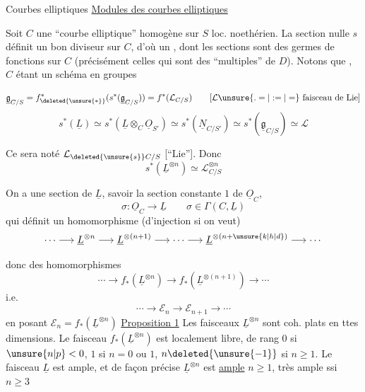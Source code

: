 Courbes elliptiques
\uline{Modules des courbes elliptiques}

Soit $C$ une ``courbe elliptique'' homogène sur $S$ loc. noethérien. La section nulle $s$ définit un bon diviseur  sur $C$, d'où un , dont les  sections sont des  germes de fonctions sur $C$ (précisément celles qui sont des ``multiples'' de $D$). Notons que , $C$ étant un schéma en groupes


\[
\underline{\mathfrak g}_{C/S}=f^{*}_{\deleted{\unsure{*}}}(s^*(\underline{\mathfrak g}_{C/S}))=f^*(\mathcal L_{C/S})\qquad [\mathcal L\unsure{.=|:=|=}\text{ faisceau de Lie}]
\]
\[
s^*(\underline L)\simeq s^*(\underline L\otimes_C\underline O_{S'})\simeq s^*(\underline N_{C/S'})\simeq s^*(\underline{\mathfrak g}_{C/S})\simeq\mathcal L
\]

Ce  sera noté $\mathcal L_{\deleted{\unsure{s}}C/S}$ [``Lie'']. Donc
\[
s^*(\underline L^{\otimes n})\simeq\mathcal L_{C/S}^{\otimes n}
\]

On a une section  de $\underline L$, savoir la section constante $1$ de $\underline O_C$,
\[
\sigma:\underline O_C\longrightarrow\underline L\qquad \sigma\in\Gamma(C,\underline L)
\]
qui définit un homomorphisme (d'injection si on veut)
\[
\cdots\longrightarrow\underline L^{\otimes n}\longrightarrow\underline L^{\otimes(n+1)}
\longrightarrow\cdots\longrightarrow\underline L^{\otimes(n+\unsure{k|h|d})}\longrightarrow\cdots
\]

donc  des homomorphismes
\[
\cdots\longrightarrow f_*(\underline L^{\otimes n})\longrightarrow f_*(\underline L^{\otimes(n+1)})\longrightarrow\cdots
\]
i.e.
\[
\cdots\longrightarrow\mathcal E_n\longrightarrow\mathcal E_{n+1}\longrightarrow\cdots
\]
en posant \(\mathcal E_n=f_*(\underline L^{\otimes n})\)
\uline{Proposition 1} Les faisceaux $\underline L^{\otimes n}$ sont coh. plats en ttes dimensions. Le faisceau $f_*(\underline L^{\otimes n})$ est localement libre, de rang $0$ si $\unsure{n|p}<0$, $1$ si $n=0$ ou $1$, $n\deleted{\unsure{-1}}$ si $n\geq1$.  Le faisceau $\underline L$ est ample, et de façon précise $\underline L^{\otimes n}$ est  \uline{ample}  $n\geq1$, très ample ssi $n\geq3$

